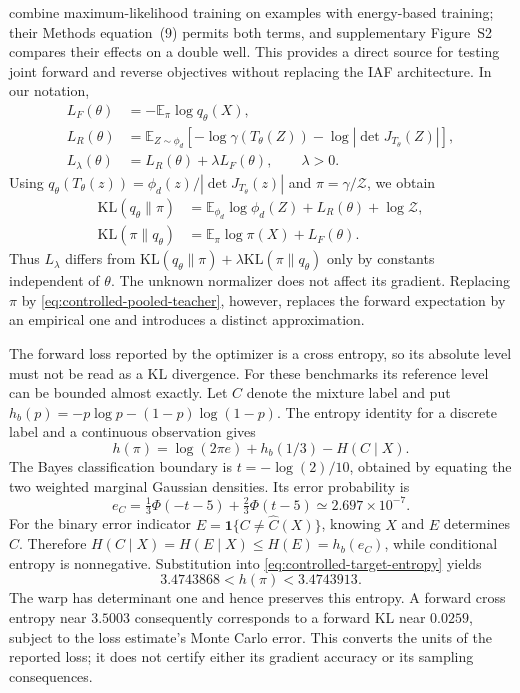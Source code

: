 \citet{noe2019boltzmanngenerators} combine maximum-likelihood training on
examples with energy-based training; their Methods equation~(9) permits both
terms, and supplementary Figure~S2 compares their effects on a double well.
This provides a direct source for testing joint forward and reverse objectives
without replacing the IAF architecture. In our notation,
\begin{align}
 L_F(\theta)&=-\mathbb E_\pi\log q_\theta(X),\\
 L_R(\theta)&=\mathbb E_{Z\sim\phi_d}
 \left[-\log\gamma(T_\theta(Z))-\log|\det J_{T_\theta}(Z)|\right],\\
 L_\lambda(\theta)&=L_R(\theta)+\lambda L_F(\theta),\qquad\lambda>0.
 \label{eq:controlled-joint-loss}
\end{align}
Using $q_\theta(T_\theta(z))=\phi_d(z)/|\det J_{T_\theta}(z)|$ and
$\pi=\gamma/\mathcal Z$, we obtain
\begin{align}
 \mathrm{KL}(q_\theta\|\pi)
 &=\mathbb E_{\phi_d}\log\phi_d(Z)+L_R(\theta)+\log\mathcal Z,\\
 \mathrm{KL}(\pi\|q_\theta)
 &=\mathbb E_\pi\log\pi(X)+L_F(\theta).
\end{align}
Thus $L_\lambda$ differs from
$\mathrm{KL}(q_\theta\|\pi)+\lambda\mathrm{KL}(\pi\|q_\theta)$ only
by constants independent of $\theta$. The unknown normalizer does not affect
its gradient. Replacing $\pi$ by \eqref{eq:controlled-pooled-teacher}, however,
replaces the forward expectation by an empirical one and introduces a distinct
approximation.

The forward loss reported by the optimizer is a cross entropy, so its absolute
level must not be read as a KL divergence. For these benchmarks its reference
level can be bounded almost exactly. Let $C$ denote the mixture label and put
$h_b(p)=-p\log p-(1-p)\log(1-p)$. The entropy identity for a discrete label
and a continuous observation gives
\begin{equation}
 h(\pi)=\log(2\pi e)+h_b(1/3)-H(C\mid X).
 \label{eq:controlled-target-entropy}
\end{equation}
The Bayes classification boundary is $t=-\log(2)/10$, obtained by equating
the two weighted marginal Gaussian densities. Its error probability is
\begin{equation}
 e_C=\tfrac13\Phi(-t-5)+\tfrac23\Phi(t-5)
     \simeq2.697\times10^{-7}.
\end{equation}
For the binary error indicator $E=\mathbf1\{C\ne\widehat C(X)\}$, knowing
$X$ and $E$ determines $C$. Therefore
$H(C\mid X)=H(E\mid X)\leq H(E)=h_b(e_C)$, while conditional entropy is
nonnegative. Substitution into \eqref{eq:controlled-target-entropy} yields
\begin{equation}
 3.4743868<h(\pi)<3.4743913.
\end{equation}
The warp has determinant one and hence preserves this entropy. A forward cross
entropy near $3.5003$ consequently corresponds to a forward KL near $0.0259$,
subject to the loss estimate's Monte Carlo error. This converts the units of
the reported loss; it does not certify either its gradient accuracy or its
sampling consequences.

